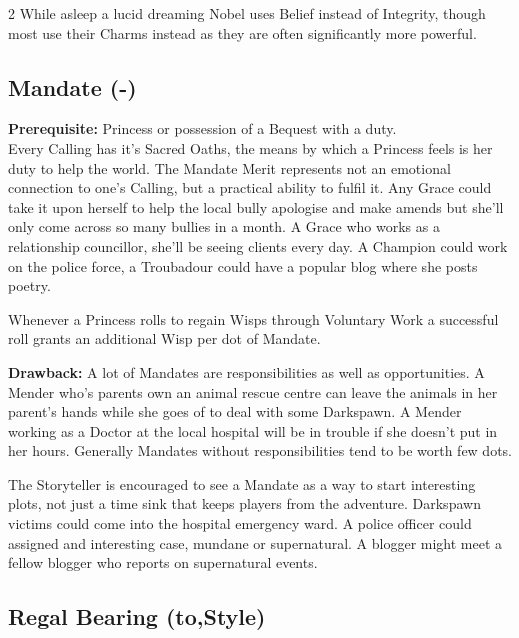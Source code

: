 \begin{multicols}{2}
While asleep a lucid dreaming Nobel uses Belief instead of Integrity, though most use their Charms instead as they are often significantly more powerful.

\subsection*{Mandate (\textbullet\nobreak\hspace{.16667em}-\nobreak\hspace{.16667em}\textbullet\textbullet\textbullet)}

\textbf{Prerequisite:} Princess or possession of a Bequest with a duty. \\

\noindent Every Calling has it's Sacred Oaths, the means by which a Princess feels is her duty to help the world. The Mandate Merit represents not an emotional connection to one's Calling, but a practical ability to fulfil it. Any Grace could take it upon herself to help the local bully apologise and make amends but she'll only come across so many bullies in a month. A Grace who works as a relationship councillor, she'll be seeing clients every day. A Champion could work on the police force, a Troubadour could have a popular blog where she posts poetry. 

Whenever a Princess rolls to regain Wisps through Voluntary Work a successful roll grants an additional Wisp per dot of Mandate.

\textbf{Drawback:} A lot of Mandates are responsibilities as well as opportunities. A Mender who's parents own an animal rescue centre can leave the animals in her parent's hands while she goes of to deal with some Darkspawn. A Mender working as a Doctor at the local hospital will be in trouble if she doesn’t put in her hours. Generally Mandates without responsibilities tend to be worth few dots. 

The Storyteller is encouraged to see a Mandate as a way to start interesting plots, not just a time sink that keeps players from the adventure. Darkspawn victims could come into the hospital emergency ward. A police officer could assigned and interesting case, mundane or supernatural. A blogger might meet a fellow blogger who reports on supernatural events. 

\subsection*{Regal Bearing (\textbullet\nobreak\hspace{.16667em}to\nobreak\hspace{.16667em}\textbullet\textbullet\textbullet\textbullet\textbullet,\nobreak\hspace{.16667em}Style)}


\end{multicols}
